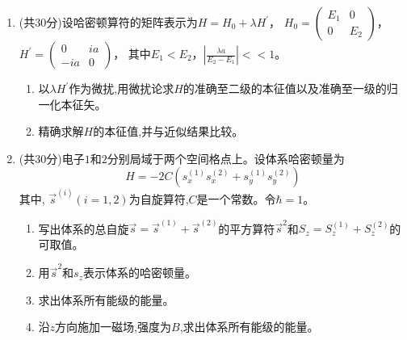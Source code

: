 \begin{enumerate}
\begin{enumerate}
	
\end{enumerate}

\banswer{
	
}

	
\item 	
(共30分)设哈密顿算符的矩阵表示为$H=H_{0}+\lambda H^{\prime}$，
$H_{0}=\left(\begin{array}{cc}E_{1} & 0 \\ 0 & E_{2}\end{array}\right)$， $H^{\prime}=\left(\begin{array}{cc}0 & i a \\ -i a & 0\end{array}\right)$，
其中$E_{1}<E_{2}$，$\left|\frac{\lambda a}{E_{2}-E_{1}}\right|<<1$。
\begin{enumerate}
	\item
以$ \lambda H ^{\prime}  $作为微扰,用微扰论求$ H $的准确至二级的本征值以及准确至一级的归一化本征矢。
	
	
\item 
精确求解$ H $的本征值,并与近似结果比较。


	
	
	
	
\end{enumerate}


\banswer{
	
}



\item 
(共30分)电子$ 1 $和$ 2 $分别局域于两个空间格点上。设体系哈密顿量为
$$
H=-2 C\left(s_{x}^{(1)} s_{x}^{(2)}+s_{y}^{(1)} s_{y}^{(2)}\right)
$$
其中, $\vec{s}^{(i)} (i=1,2)$为自旋算符,$ C $是一个常数。令$ \hbar=1 $。

\begin{enumerate}
	\item
写出体系的总自旋$\vec{s}=\vec{s}^{(1)}+\vec{s}^{(2)}$的平方算符$\vec{s}^{2}$和$S_{z}=S_{z}^{(1)}+S_{z}^{(2)}$的可取值。

\item 
用$\vec{s}^{2}$和$ s_{z} $表示体系的哈密顿量。

\item 
求出体系所有能级的能量。

\item 
沿$ z $方向施加一磁场,强度为$ B $,求出体系所有能级的能量。


\end{enumerate}


\banswer{
	
}

	
\end{enumerate}

